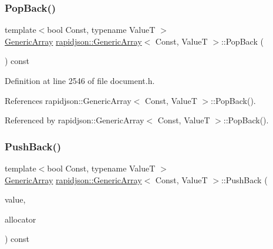 \subsubsection{\texorpdfstring{PopBack()}{PopBack()}}
{\footnotesize\ttfamily template$<$bool Const, typename ValueT $>$ \\
\mbox{\hyperlink{classrapidjson_1_1_generic_array}{Generic\+Array}} \mbox{\hyperlink{classrapidjson_1_1_generic_array}{rapidjson\+::\+Generic\+Array}}$<$ Const, ValueT $>$\+::Pop\+Back (\begin{DoxyParamCaption}{ }\end{DoxyParamCaption}) const}



Definition at line 2546 of file document.\+h.


\begin{DoxyCode}{0}

\end{DoxyCode}


References rapidjson\+::\+Generic\+Array$<$ Const, Value\+T $>$\+::\+Pop\+Back().



Referenced by rapidjson\+::\+Generic\+Array$<$ Const, Value\+T $>$\+::\+Pop\+Back().

\mbox{\label{classrapidjson_1_1_generic_array_a0bcd130448a9d68303523df7b22dc452}} 
\subsubsection{\texorpdfstring{PushBack()}{PushBack()}\hspace{0.1cm}{\footnotesize\ttfamily [1/2]}}
{\footnotesize\ttfamily template$<$bool Const, typename ValueT $>$ \\
\mbox{\hyperlink{classrapidjson_1_1_generic_array}{Generic\+Array}} \mbox{\hyperlink{classrapidjson_1_1_generic_array}{rapidjson\+::\+Generic\+Array}}$<$ Const, ValueT $>$\+::Push\+Back (\begin{DoxyParamCaption}\item[{\mbox{\hyperlink{classrapidjson_1_1_generic_array_aebd828a2f020262b41af908fbb28a571}{Value\+Type}} \&}]{value,  }\item[{\mbox{\hyperlink{classrapidjson_1_1_generic_array_a82298d507b2b15c9d909c25a32f5afeb}{Allocator\+Type}} \&}]{allocator }\end{DoxyParamCaption}) const}



